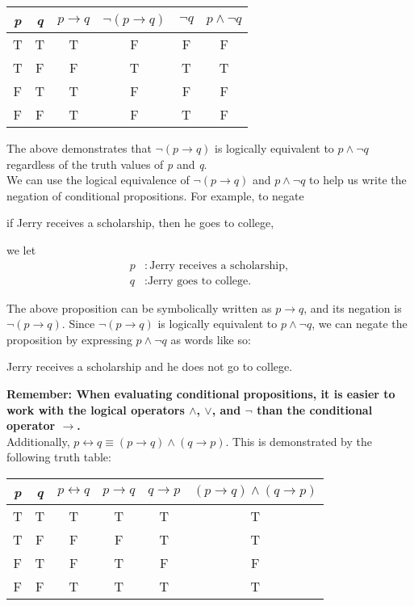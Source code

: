 \begin{table}[h]
\centering
\begin{tabular}{|c|c|c|c|c|c|}
\hline
\textit{p} & \textit{q} & $p \rightarrow q$ & $\lnot (p \rightarrow q)$ & $\lnot q$ & $p \land \lnot q$ \\ \hline
T & T & T & F & F & F \\ \hline
T & F & F & T & T & T \\ \hline
F & T & T & F & F & F \\ \hline
F & F & T & F & T & F \\ \hline
\end{tabular}
\end{table}

The above demonstrates that $\lnot (p \rightarrow q)$ is logically equivalent to $p \land \lnot q$ regardless of the truth values of \textit{p} and \textit{q}.\\

We can use the logical equivalence of $\lnot (p \rightarrow q)$ and $p \land \lnot q$ to help us write the negation of conditional propositions.  For example, to negate
\begin{center}
    if Jerry receives a scholarship, then he goes to college,
\end{center}

we let
\begin{align*}
p&: \text{Jerry receives a scholarship},\\
q&: \text{Jerry goes to college.}
\end{align*}

The above proposition can be symbolically written as $p \rightarrow q$, and its negation is $\lnot (p \rightarrow q)$.  Since $\lnot (p \rightarrow q)$ is logically equivalent to $p \land \lnot q$, we can negate the proposition by expressing $p \land \lnot q$ as words like so:
\begin{center}
    Jerry receives a scholarship and he does not go to college.
\end{center}

\textbf{Remember: When evaluating conditional propositions, it is easier to work with the logical operators $\land$, $\vee$, and $\lnot$ than the conditional operator $\rightarrow$.}\\

Additionally, $p \leftrightarrow q \equiv (p \rightarrow q) \land (q \rightarrow p)$.  This is demonstrated by the following truth table:

\begin{table}[h]
\centering
\begin{tabular}{|c|c|c|c|c|c|}
\hline
\textit{p} & \textit{q} & $p \leftrightarrow q$ & $p \rightarrow q$ & $q \rightarrow p$ & $(p \rightarrow q) \land (q \rightarrow p)$  \\ \hline
T & T & T & T & T & T \\ \hline
T & F & F & F & T & T \\ \hline
F & T & F & T & F & F \\ \hline
F & F & T & T & T & T \\ \hline
\end{tabular}
\end{table}

